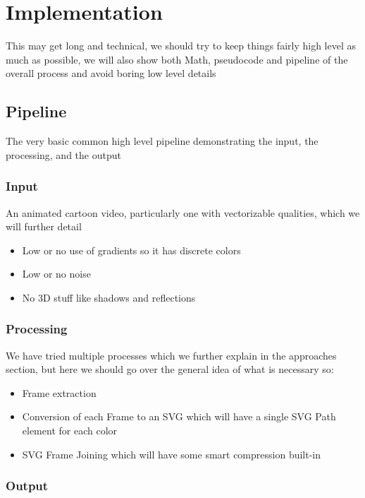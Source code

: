\documentclass[14pt]{article}
\begin{document}
    \section{Implementation}

    This may get long and technical, we should try to keep things fairly high level as much as possible,
    we will also show both Math, pseudocode and pipeline of the overall process and avoid boring low level details

    \subsection{Pipeline}

    The very basic common high level pipeline demonstrating the input, the processing, and the output

    \subsubsection{Input}

    An animated cartoon video, particularly one with vectorizable qualities, which we will further detail
    \begin{itemize}
        \item Low or no use of gradients so it has discrete colors
        \item Low or no noise
        \item No 3D stuff like shadows and reflections
    \end{itemize}

    \subsubsection{Processing}

    We have tried multiple processes which we further explain in the approaches section, but here
    we should go over the general idea of what is necessary so:
    \begin{itemize}
        \item Frame extraction
        \item Conversion of each Frame to an SVG which will have a single SVG Path element for each color
        \item SVG Frame Joining which will have some smart compression built-in
    \end{itemize}

    \subsubsection{Output}
\end{document}
